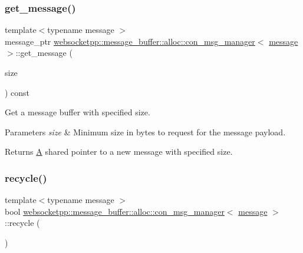 \subsubsection{\texorpdfstring{get\+\_\+message()}{get\_message()}\hspace{0.1cm}{\footnotesize\ttfamily [3/3]}}
{\footnotesize\ttfamily template$<$typename message $>$ \\
message\+\_\+ptr \mbox{\hyperlink{classwebsocketpp_1_1message__buffer_1_1alloc_1_1con__msg__manager}{websocketpp\+::message\+\_\+buffer\+::alloc\+::con\+\_\+msg\+\_\+manager}}$<$ \mbox{\hyperlink{classwebsocketpp_1_1message__buffer_1_1message}{message}} $>$\+::get\+\_\+message (\begin{DoxyParamCaption}\item[{size\+\_\+t}]{size }\end{DoxyParamCaption}) const\hspace{0.3cm}{\ttfamily [inline]}}



Get a message buffer with specified size. 


\begin{DoxyParams}{Parameters}
{\em size} & Minimum size in bytes to request for the message payload.\\
\hline
\end{DoxyParams}
\begin{DoxyReturn}{Returns}
\mbox{\hyperlink{struct_a}{A}} shared pointer to a new message with specified size. 
\end{DoxyReturn}
\mbox{\label{classwebsocketpp_1_1message__buffer_1_1alloc_1_1con__msg__manager_a6373a7891e108a232a2a62a5696295e8}} 
\subsubsection{\texorpdfstring{recycle()}{recycle()}\hspace{0.1cm}{\footnotesize\ttfamily [1/2]}}
{\footnotesize\ttfamily template$<$typename message $>$ \\
bool \mbox{\hyperlink{classwebsocketpp_1_1message__buffer_1_1alloc_1_1con__msg__manager}{websocketpp\+::message\+\_\+buffer\+::alloc\+::con\+\_\+msg\+\_\+manager}}$<$ \mbox{\hyperlink{classwebsocketpp_1_1message__buffer_1_1message}{message}} $>$\+::recycle (\begin{DoxyParamCaption}\item[{\mbox{\hyperlink{classwebsocketpp_1_1message__buffer_1_1message}{message}} $\ast$}]{ }\end{DoxyParamCaption})\hspace{0.3cm}{\ttfamily [inline]}}



